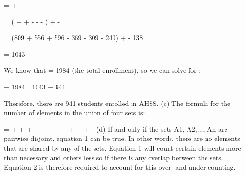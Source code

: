 \documentclass[a4paper]{exam}
\begin{document}
\begin{questions}
\begin{solution}
     =  +  - 
    
    \hspace{1.3cm}= ( +  +  -  -  - ) +  - 
    
    \hspace{1.4cm} = (809 + 556 + 596 - 369 - 309 - 240) +  - 138
    
    \hspace{1.5cm}= 1043 + 
    
    We know that  = 1984 (the total enrollment), so we can solve for :
    
     = 1984 - 1043
     = 941
    
    Therefore, there are 941 students enrolled in AHSS.
    \newline
    \newline
    (c) The formula for the number of elements in the union of four sets is:
    
     =  +  +  +  -  -  -  -  -  -  +  +  +  +  - 
    \newline
    \newline
    (d) If and only if the sets A1, A2,..., An are pairwise disjoint, equation 1 can be true. In other words, there are no elements that are shared by any of the sets. Equation 1 will count certain elements more than necessary and others less so if there is any overlap between the sets. Equation 2 is therefore required to account for this over- and under-counting.



  \end{solution}


\end{questions}
\end{document}
